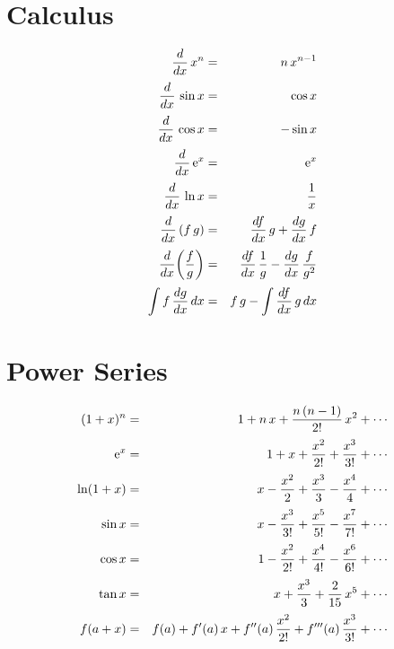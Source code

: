 \section{Calculus}
\begin{eqnarray}
\frac{d}{dx}\,x^n &=& n\,x^{n-1}\nonumber\\[0.5ex]
\frac{d}{dx}\,\sin x &=& \cos x\nonumber\\[0.5ex]
\frac{d}{dx}\,\cos x &=&-\sin x\nonumber\\[0.5ex]
\frac{d}{dx}\,{\rm e}^{x} &=& {\rm e}^x\nonumber\\[0.5ex]
\frac{d}{dx}\,\ln x &=& \frac{1}{x}\nonumber\\[0.5ex]
\frac{d}{dx}\,(f\,g)&=& \frac{df}{dx}\,g + \frac{dg}{dx}\,f\nonumber\\[0.5ex]
\frac{d}{dx}\!\left(\frac{f}{g}\right) &=& \frac{df}{dx}\,\frac{1}{g} - \frac{dg}{dx}\,\frac{f}{g^2}\nonumber\\[0.5ex]
\int f\,\frac{dg}{dx}\,dx &=& f\,g - \int\frac{df}{dx}\,g\,dx\nonumber
\end{eqnarray}

\section{Power Series}
\begin{eqnarray}
(1+x)^n &=& 1 + n\,x + \frac{n\,(n-1)}{2!}\,x^2 + \cdots\nonumber\\[0.5ex]
{\rm e}^x &=& 1 + x + \frac{x^2}{2!} + \frac{x^3}{3!}+\cdots\nonumber\\[0.5ex]
\ln(1+x)&=& x - \frac{x^2}{2}+ \frac{x^3}{3}-\frac{x^4}{4}+\cdots\nonumber\\[0.5ex]
\sin x &=& x - \frac{x^3}{3!} + \frac{x^5}{5!}-\frac{x^7}{7!}+\cdots\nonumber\\[0.5ex]
\cos x &=&1-\frac{x^2}{2!} + \frac{x^4}{4!}-\frac{x^6}{6!}+\cdots\nonumber\\[0.5ex]
\tan x &=& x + \frac{x^3}{3} + \frac{2}{15}\,x^5+\cdots\nonumber\\[0.5ex]
f(a+x) &=& f(a) + f'(a)\,x + f''(a)\,\frac{x^2}{2!} + f'''(a)\,\frac{x^3}{3!} + \cdots\nonumber
\end{eqnarray}